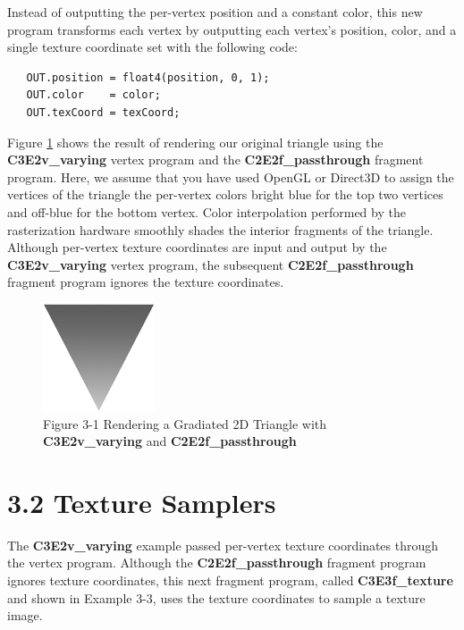 \documentclass{book}
\begin{document}
Instead of outputting the per-vertex position and a constant color, this new program transforms each vertex by outputting each vertex's position, color, and a single texture coordinate set with the following code:

\FloatBarrier
\begin{lstlisting}
   OUT.position = float4(position, 0, 1);
   OUT.color    = color;
   OUT.texCoord = texCoord;
\end{lstlisting}
\FloatBarrier

Figure \ref{fig:3-1} shows the result of rendering our original triangle using the \textbf{C3E2v_varying} vertex program and the \textbf{C2E2f_passthrough} fragment program. Here, we assume that you have used OpenGL or Direct3D to assign the vertices of the triangle the per-vertex colors bright blue for the top two vertices and off-blue for the bottom vertex. Color interpolation performed by the rasterization hardware smoothly shades the interior fragments of the triangle. Although per-vertex texture coordinates are input and output by the \textbf{C3E2v_varying} vertex program, the subsequent \textbf{C2E2f_passthrough} fragment program ignores the texture coordinates.

\begin{figure}
    \centering
    \includegraphics[width=0.5\linewidth]{Images/fig3_1.jpg}
    \caption{Figure 3-1 Rendering a Gradiated 2D Triangle with \textbf{C3E2v_varying} and \textbf{C2E2f_passthrough}}
    \label{fig:3-1}
\end{figure}

\section{3.2 Texture Samplers}

The \textbf{C3E2v_varying} example passed per-vertex texture coordinates through the vertex program. Although the \textbf{C2E2f_passthrough} fragment program ignores texture coordinates, this next fragment program, called \textbf{C3E3f_texture} and shown in Example 3-3, uses the texture coordinates to sample a texture image.
\end{document}
